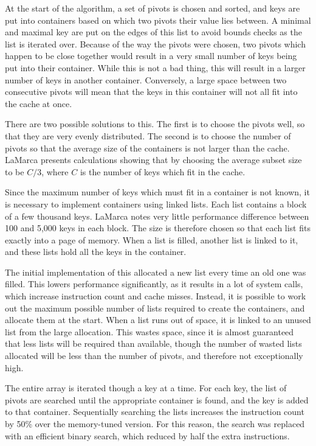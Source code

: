 At the start of the algorithm, a set of pivots is chosen and sorted, and keys
are put into containers based on which two pivots their value lies between. A
minimal and maximal key are put on the edges of this list to avoid bounds checks
as the list is iterated over. Because of the way the pivots were chosen, two
pivots which happen to be close together would result in a very small number of
keys being put into their container. While this is not a bad thing, this will
result in a larger number of keys in another container. Conversely, a large
space between two consecutive pivots will mean that the keys in this
container will not all fit into the cache at once.

There are two possible solutions to this. The first is to choose the pivots
well, so that they are very evenly distributed. The second is to choose the
number of pivots so that the average size of the containers is not larger than
the cache. LaMarca presents calculations showing that by choosing the average
subset size to be $C/3$, where $C$ is the number of keys which fit in the
cache.

Since the maximum number of keys which must fit in a container is not known, it
is necessary to implement containers using linked lists. Each list contains a
block of a few thousand keys. LaMarca notes very little performance difference
between 100 and 5,000 keys in each block. The size is therefore chosen so that
each list fits exactly into a page of memory. When a list is filled, another
list is linked to it, and these lists hold all the keys in the container.

The initial implementation of this allocated a new list every time an old one
was filled. This lowers performance significantly, as it results in a lot of
system calls, which increase instruction count and cache misses. Instead, it is
possible to work out the maximum possible number of lists required to create the
containers, and allocate them at the start. When a list runs out of space, it is
linked to an unused list from the large allocation. This wastes space, since it
is almost guaranteed that less lists will be required than available, though the
number of wasted lists allocated will be less than the number of pivots, and
therefore not exceptionally high.

The entire array is iterated though a key at a time. For each key, the list
of pivots are searched until the appropriate container is found, and the key is
added to that container. Sequentially searching the lists increases the
instruction count by 50\% over the memory-tuned version. For this reason, the
search was replaced with an efficient binary search, which reduced by half the
extra instructions.

